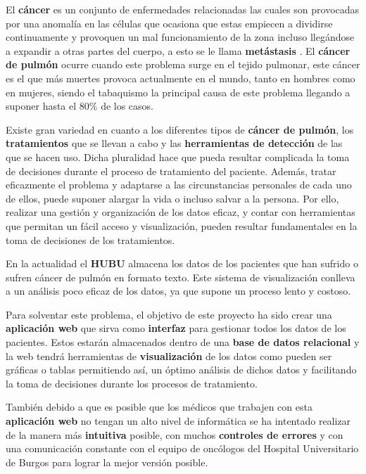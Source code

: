 El \textbf{cáncer} es un conjunto de enfermedades relacionadas las cuales son provocadas por una anomalía en las células que ocasiona que estas empiecen a dividirse continuamente y provoquen un mal funcionamiento de la zona incluso llegándose a expandir a otras partes del cuerpo, a esto se le llama \textbf{metástasis} \cite{cancerweb:online}. El \textbf{cáncer de pulmón} ocurre cuando este problema surge en el tejido pulmonar, este cáncer es el que más muertes provoca actualmente en el mundo, tanto en hombres como en mujeres, siendo el tabaquismo la principal causa de este problema llegando a suponer hasta el 80\% de los casos\cite{cancerpulmon:online}.

Existe gran variedad en cuanto a los diferentes tipos de \textbf{cáncer de pulmón}, los \textbf{tratamientos} que se llevan a cabo y las \textbf{herramientas de detección} de las que se hacen uso. Dicha pluralidad hace que pueda resultar complicada la toma de decisiones durante el proceso de tratamiento del paciente. Además, tratar eficazmente el problema y adaptarse a las circunstancias personales de cada uno de ellos, puede suponer alargar la vida o incluso salvar a la persona. Por ello, realizar una gestión y organización de los datos eficaz, y contar con herramientas que permitan un fácil acceso y visualización, pueden resultar fundamentales en la toma de decisiones de los tratamientos.


En la actualidad el \textbf{HUBU} almacena los datos de los pacientes que han sufrido o sufren cáncer de pulmón en formato texto. Este sistema de visualización conlleva a un análisis poco eficaz de los datos, ya que supone un proceso lento y costoso.

Para solventar este problema, el objetivo de este proyecto ha sido crear una \textbf{aplicación web} que sirva como \textbf{interfaz} para gestionar todos los datos de los pacientes. Estos estarán almacenados dentro de una \textbf{base de datos relacional} y la web tendrá herramientas de \textbf{visualización} de los datos como pueden ser gráficas o tablas permitiendo así, un óptimo análisis de dichos datos y facilitando la toma de decisiones durante los procesos de tratamiento.

También debido a que es posible que los médicos que trabajen con esta  \textbf{aplicación web} no tengan un alto nivel de informática se ha intentado realizar de la manera más \textbf{intuitiva} posible, con muchos  \textbf{controles de errores} y con una comunicación constante con el equipo de oncólogos del Hospital Universitario de Burgos para lograr la mejor versión posible.

